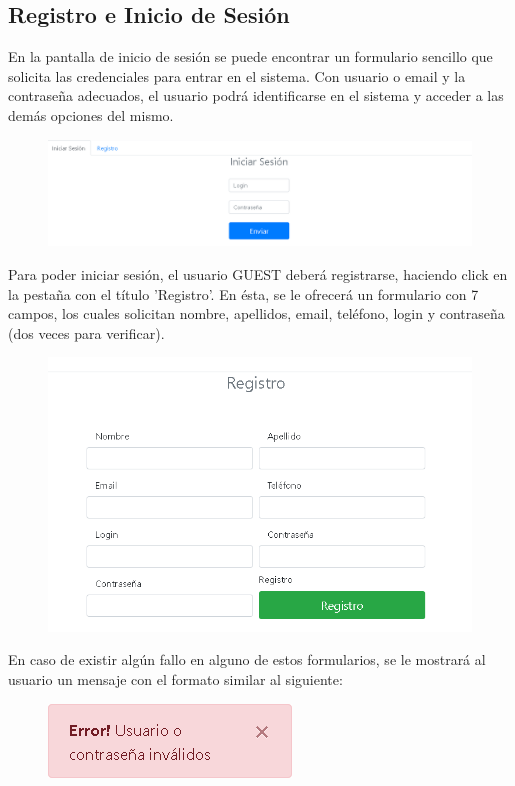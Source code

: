 \subsection{Registro e Inicio de Sesi\'{o}n}
En la pantalla de inicio de sesi\'{o}n se puede encontrar un formulario sencillo que solicita las credenciales para entrar en el sistema. Con usuario o email y la contrase\~{n}a adecuados, el usuario podr\'{a} identificarse en el sistema y acceder a las dem\'{a}s opciones del mismo.


\begin{figure}[h!]
\centering
\includegraphics[width=.7\textwidth]{Img/ManualUsuario/LOGIN.png}
\end{figure}


Para poder iniciar sesi\'{o}n, el usuario GUEST deber\'{a} registrarse, haciendo click en la pesta\~{n}a con el t\'{i}tulo 'Registro'. En \'{e}sta, se le ofrecer\'{a} un formulario con 7 campos, los cuales solicitan nombre, apellidos, email, tel\'{e}fono, login y contrase\~{n}a (dos veces para verificar).

\begin{figure}[h!]
\centering
\includegraphics[width=.5\textwidth]{Img/ManualUsuario/REGISTRO.png}
\end{figure}

En caso de existir alg\'{u}n fallo en alguno de estos formularios, se le mostrar\'{a} al usuario un mensaje con el formato similar al siguiente:

\begin{figure}[h!]
\centering
\includegraphics[width=.3\textwidth]{Img/ManualUsuario/ERROR_LOGIN.png}
\end{figure}


